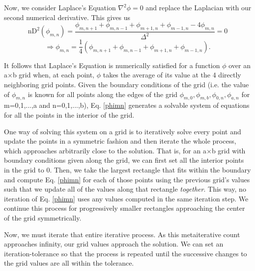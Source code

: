 \documentclass{article}
\begin{document}
Now, we consider Laplace's Equation $\nabla^2 \phi = 0$ and replace the Laplacian with our second numerical derivative. This gives us
\begin{equation}
\mbox{nD}^2(\phi_{m,n}) = \frac{\phi_{m,n+1}+\phi_{m,n-1}+\phi_{m+1,n}+\phi_{m-1,n}-4\phi_{m,n}}{\Delta^2}=0
\end{equation}
\begin{equation} \label{phimn}
\Rightarrow \phi_{m,n}=\frac{1}{4}(\phi_{m,n+1}+\phi_{m,n-1}+\phi_{m+1,n}+\phi_{m-1,n}).
\end{equation}

It follows that Laplace's Equation is numerically satisfied for a function $\phi$ over an a$\times$b grid when, at each point, $\phi$ takes the average of its value at the 4 directly neighboring grid points. Given the boundary conditions of the grid (i.e. the value of $\phi_{m,n}$ is known for all points along the edges of the grid $\phi_{m,0},\phi_{m,b},\phi_{0,n},\phi_{a,n}$ for m=0,1,...,a and n=0,1,...,b), Eq. \ref{phimn} generates a solvable system of equations for all the points in the interior of the grid.

One way of solving this system on a grid is to iteratively solve every point and update the points in a symmetric fashion and then iterate the whole process, which approaches arbitrarily close to the solution. That is, for an a$\times$b grid with boundary conditions given along the grid, we can first set all the interior points in the grid to 0. Then, we take the largest rectangle that fits within the boundary and compute Eq. \ref{phimn} for each of those points using the previous grid's values such that we update all of the values along that rectangle \emph{together}. This way, no iteration of Eq. \ref{phimn} uses any values computed in the same iteration step. We continue this process for progressively smaller rectangles approaching the center of the grid symmetrically.

Now, we must iterate that entire iterative process. As this metaiterative count approaches infinity, our grid values approach the solution. We can set an iteration-tolerance so that the process is repeated until the successive changes to the grid values are all within the tolerance.
\end{document}
